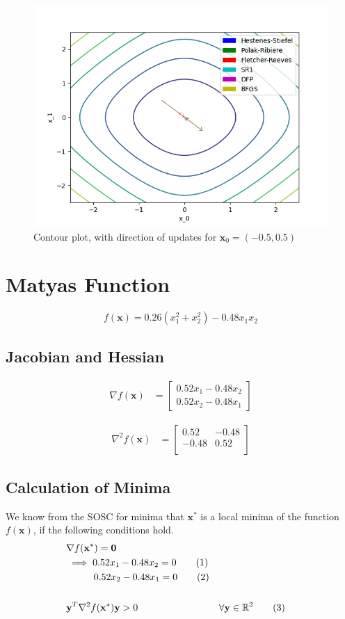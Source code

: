 \documentclass[a4paper]{article}
\newcommand\numberthis{\addtocounter{equation}{1}\tag{\theequation}}
\begin{document}
\begin{figure}[H]
    \centering
    \includegraphics[width=.65\textwidth]{images/func_1_cont.png}
    \caption{Contour plot, with direction of updates for $\textbf{x}_0 = (-0.5, 0.5)$}
\end{figure}

\section{Matyas Function}

$$f(\textbf{x}) = 0.26(x_1^2 + x_2^2) - 0.48 x_1 x_2$$

\subsection{Jacobian and Hessian}

\begin{align*}
\nabla f(\textbf{x}) &=
    \begin{bmatrix}
        0.52x_1 - 0.48x_2 \\
        0.52x_2 - 0.48x_1
    \end{bmatrix}
\end{align*}

\begin{align*}
\nabla^2 f(\textbf{x}) &=
    \begin{bmatrix}
        0.52 & -0.48 \\
        -0.48 & 0.52 \\
    \end{bmatrix}
\end{align*}

\subsection{Calculation of Minima}

We know from the SOSC for minima that $\textbf{x}^*$ is a local minima of the function $f(\textbf{x})$, if the following conditions hold.
\begin{align*}
&\nabla f(\textbf{x}^*) = \textbf{0} \\
&\implies 0.52x_1 - 0.48x_2 = 0 \numberthis \label{matyas-sosc-1} \\
&\phantom{\implies} \ \ 0.52x_2 - 0.48x_1 = 0 \numberthis \label{matyas-sosc-2} \\ \\
&\textbf{y}^T \nabla^2 f(\textbf{x}^*) \textbf{y} > 0 &&\forall \textbf{y} \in \mathbb{R}^2 \numberthis \label{matyas-sosc-3}
\end{align*}
\end{document}
